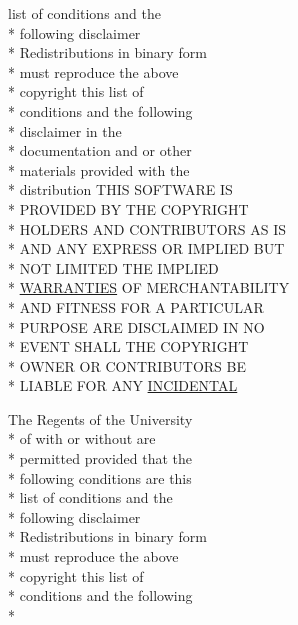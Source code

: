 \begin{DoxyCompactItemize}
list of conditions and the \\*
following disclaimer \\*
Redistributions in binary form \\*
must reproduce the above \\*
copyright this list of \\*
conditions and the following \\*
disclaimer in the \\*
documentation and or other \\*
materials provided with the \\*
distribution T\+H\+I\+S S\+O\+F\+T\+W\+A\+R\+E I\+S \\*
P\+R\+O\+V\+I\+D\+E\+D B\+Y T\+H\+E C\+O\+P\+Y\+R\+I\+G\+H\+T \\*
H\+O\+L\+D\+E\+R\+S A\+N\+D C\+O\+N\+T\+R\+I\+B\+U\+T\+O\+R\+S A\+S I\+S \\*
A\+N\+D A\+N\+Y E\+X\+P\+R\+E\+S\+S O\+R I\+M\+P\+L\+I\+E\+D B\+U\+T \\*
N\+O\+T L\+I\+M\+I\+T\+E\+D T\+H\+E I\+M\+P\+L\+I\+E\+D \\*
\hyperlink{_l_i_c_e_n_s_e_a3f8645b457d8bdef4fd7c3549fc01039}{W\+A\+R\+R\+A\+N\+T\+I\+E\+S} O\+F M\+E\+R\+C\+H\+A\+N\+T\+A\+B\+I\+L\+I\+T\+Y \\*
A\+N\+D F\+I\+T\+N\+E\+S\+S F\+O\+R A P\+A\+R\+T\+I\+C\+U\+L\+A\+R \\*
P\+U\+R\+P\+O\+S\+E A\+R\+E D\+I\+S\+C\+L\+A\+I\+M\+E\+D I\+N N\+O \\*
E\+V\+E\+N\+T S\+H\+A\+L\+L T\+H\+E C\+O\+P\+Y\+R\+I\+G\+H\+T \\*
O\+W\+N\+E\+R O\+R C\+O\+N\+T\+R\+I\+B\+U\+T\+O\+R\+S B\+E \\*
L\+I\+A\+B\+L\+E F\+O\+R A\+N\+Y \hyperlink{_l_i_c_e_n_s_e_a84960be3d0abae92fe44514f2b6ae3a2}{I\+N\+C\+I\+D\+E\+N\+T\+A\+L}
\item 
The Regents of the University \\*
of with or without are \\*
permitted provided that the \\*
following conditions are this \\*
list of conditions and the \\*
following disclaimer \\*
Redistributions in binary form \\*
must reproduce the above \\*
copyright this list of \\*
conditions and the following \\*

\end{DoxyCompactItemize}
